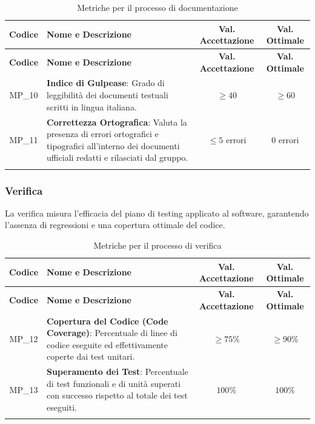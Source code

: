 \documentclass[12pt, a4paper]{article}
\newlength{\LargColVal} %
\begin{document}
\renewcommand{\arraystretch}{1.3}
\begin{xltabular}{\textwidth}{|c|X|C{\LargColVal}|C{\LargColVal}|}

    \hline
    \textbf{Codice} & \textbf{Nome e Descrizione} & \textbf{Val. Accettazione} & \textbf{Val. Ottimale} \\ \hline
    \endfirsthead

    \hline
    \textbf{Codice} & \textbf{Nome e Descrizione} & \textbf{Val. Accettazione} & \textbf{Val. Ottimale} \\ \hline
    \endhead

    MP\_10 & \textbf{Indice di Gulpease}: Grado di leggibilità dei documenti testuali scritti in lingua italiana. & $\ge 40$ & $\ge 60$ \\ \hline

    MP\_11 & \textbf{Correttezza Ortografica}: Valuta la presenza di errori ortografici e tipografici all'interno dei documenti ufficiali redatti e rilasciati dal gruppo. & $\le 5$ errori & $0$ errori \\ \hline

    \caption{Metriche per il processo di documentazione}
    \label{tab:metriche_documentazione}
    \end{xltabular}



\subsubsection{Verifica}
La verifica misura l'efficacia del piano di testing applicato al software, garantendo l'assenza di regressioni e una copertura ottimale del codice.

\renewcommand{\arraystretch}{1.3}
\begin{xltabular}{\textwidth}{|c|X|C{\LargColVal}|C{\LargColVal}|}

    \hline
    \textbf{Codice} & \textbf{Nome e Descrizione} & \textbf{Val. Accettazione} & \textbf{Val. Ottimale} \\ \hline
    \endfirsthead

    \hline
    \textbf{Codice} & \textbf{Nome e Descrizione} & \textbf{Val. Accettazione} & \textbf{Val. Ottimale} \\ \hline
    \endhead

    MP\_12 & \textbf{Copertura del Codice (Code Coverage)}: Percentuale di linee di codice eseguite ed effettivamente coperte dai test unitari. & $\ge 75\%$ & $\ge 90\%$ \\ \hline
    MP\_13 & \textbf{Superamento dei Test}: Percentuale di test funzionali e di unità superati con successo rispetto al totale dei test eseguiti. & $100\%$ & $100\%$ \\ \hline

    \caption{Metriche per il processo di verifica}
    \label{tab:metriche_verifica} \\
\end{xltabular}
\end{document}
